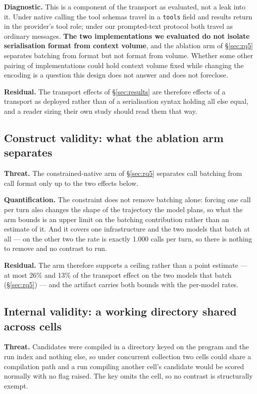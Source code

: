 \textbf{Diagnostic.} This is a component of the transport as evaluated, not a leak into it. Under native
calling the tool schemas travel in a \texttt{tools} field and results return in the provider's tool role;
under our prompted-text protocol both travel as ordinary messages. \textbf{The two implementations we
evaluated do not isolate serialisation format from context volume}, and the ablation arm of
\S\ref{sec:rq5} separates batching from format but not format from volume. Whether some other pairing of
implementations could hold context volume fixed while changing the encoding is a question this design does
not answer and does not foreclose.

\textbf{Residual.} The transport effects of \S\ref{sec:results} are therefore effects of a transport as
deployed rather than of a serialisation syntax holding all else equal, and a reader sizing their own study
should read them that way.

\subsection{Construct validity: what the ablation arm separates}

\textbf{Threat.} The constrained-native arm of \S\ref{sec:rq5} separates call batching from call format
only up to the two effects below.

\textbf{Quantification.} The constraint does not remove batching alone: forcing one call per turn also
changes the shape of the trajectory the model plans, so what the arm bounds is an upper limit on the
batching contribution rather than an estimate of it. And it covers one infrastructure and the two models
that batch at all --- on the other two the rate is exactly 1.000 calls per turn, so there is nothing to
remove and no contrast to run.

\textbf{Residual.} The arm therefore supports a ceiling rather than a point estimate --- at most 26\% and
13\% of the transport effect on the two models that batch (\S\ref{sec:rq5}) --- and the artifact carries
both bounds with the per-model rates.

\subsection{Internal validity: a working directory shared across cells}

\textbf{Threat.} Candidates were compiled in a directory keyed on the program and the run index and
nothing else, so under concurrent collection two cells could share a compilation path and a run compiling
another cell's candidate would be scored normally with no flag raised. The key omits the cell, so no
contrast is structurally exempt.

